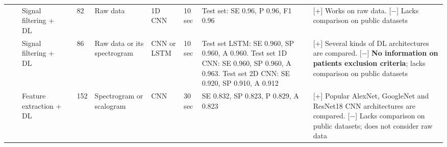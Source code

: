 \documentclass[5p,twocolumn,lefttitle]{elsarticle}
\begin{document}
\begin{table*}[!ht]
{\begin{tabularx}{2\textwidth}{@{}m{2.5em}p{7em}p{10em}lp{2em}p{12em}p{7em}p{3em}p{17em}X@{}}
                        \cmidrule(l){3-10} 
                            &                                                         & Signal filtering + DL                                          & \cite{DBLP:journals/jms/UrtnasanPJL18}   & 82            & Raw data                                                                                                          & 1D CNN                              & 10 sec                                     & Test set: SE 0.96, P 0.96, F1 0.96                                                                                                                                                         & [+] Works on raw data. [$-$] Lacks comparison on public datasets                                                                                                                                                                                                                                                                                                                                                       \\
                        \cmidrule(l){3-10} 
                            &                                                         & Signal filtering + DL                                          & \cite{DBLP:journals/cmpb/UrtnasanKPJL19} & 86            & Raw data or its spectrogram                                                                                    & CNN or LSTM                         & 10 sec                                     & Test set LSTM: SE 0.960, SP 0.960, A 0.960. Test set 1D CNN: SE 0.960, SP 0.960, A 0.963. Test set 2D CNN: SE  0.920, SP 0.910, A 0.912                                                           & [+] Several kinds of DL architectures are compared. [$-$] \textbf{No information on patients exclusion criteria}; lacks comparison on public datasets      \\
                        \cmidrule(l){3-10} 
                            &                                                         &   Feature extraction + DL                                          & \cite{nasifoglu2021obstructive} & 152            & Spectrogram or scalogram                                                                                    & CNN                  & 30 sec                                     &  SE 0.832, SP 0.823, P 0.829, A 0.823                                       & [+] Popular AlexNet, GoogleNet and ResNet18 CNN architectures are compared. [$-$] Lacks comparison on public datasets; does not consider raw data     \\

\end{tabularx}}
\end{table*}
\end{document}
